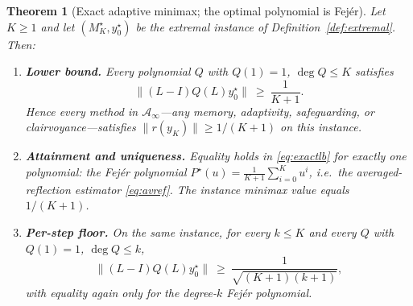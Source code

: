 \documentclass[11pt]{article}
\newtheorem{theorem}{Theorem}[section]
\theoremstyle{definition}
\theoremstyle{remark}
\newcommand{\Aa}{\mathcal{A}}
\newcommand{\norm}[1]{\| #1 \|}
\begin{document}
\begin{theorem}[Exact adaptive minimax; the optimal polynomial is
Fej\'er]\label{thm:exactminimax}
Let $K\ge1$ and let $(M_K^\star,y_0^\star)$ be the extremal instance of
Definition~\ref{def:extremal}. Then:
\begin{enumerate}[label=(\roman*)]
\item \textbf{Lower bound.} Every polynomial $Q$ with $Q(1)=1$,
      $\deg Q\le K$ satisfies
      \begin{equation}\label{eq:exactlb}
      \norm{(L-I)Q(L)y_0^\star}\ \ge\ \frac1{K+1}.
      \end{equation}
      Hence every method in $\Aa_\infty$---any memory, adaptivity,
      safeguarding, or clairvoyance---satisfies $\norm{r(y_K)}\ge1/(K+1)$
      on this instance.
\item \textbf{Attainment and uniqueness.} Equality holds in
      \eqref{eq:exactlb} for exactly one polynomial: the Fej\'er
      polynomial $P^\star(u)=\frac1{K+1}\sum_{i=0}^{K}u^i$, i.e.\ the
      averaged-reflection estimator \eqref{eq:avref}. The instance minimax
      value equals $1/(K+1)$.
\item \textbf{Per-step floor.} On the \emph{same} instance, for every
      $k\le K$ and every $Q$ with $Q(1)=1$, $\deg Q\le k$,
      \begin{equation}\label{eq:perstep}
      \norm{(L-I)Q(L)y_0^\star}\ \ge\ \frac1{\sqrt{(K+1)(k+1)}},
      \end{equation}
      with equality again only for the degree-$k$ Fej\'er polynomial.
\end{enumerate}
\end{theorem}
\end{document}
